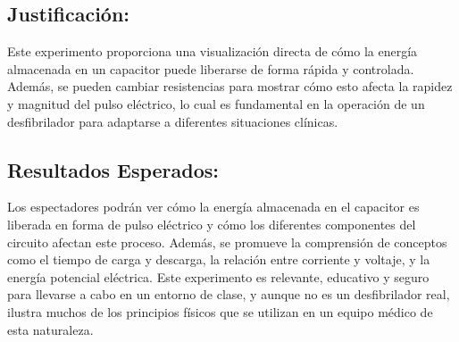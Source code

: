 \subsection{Justificación:}
Este experimento proporciona una visualización directa de cómo la energía almacenada en un capacitor puede liberarse de forma rápida y controlada. Además, se pueden cambiar resistencias para mostrar cómo esto afecta la rapidez y magnitud del pulso eléctrico, lo cual es fundamental en la operación de un desfibrilador para adaptarse a diferentes situaciones clínicas.

\subsection{Resultados Esperados:}
Los espectadores podrán ver cómo la energía almacenada en el capacitor es liberada en forma de pulso eléctrico y cómo los diferentes componentes del circuito afectan este proceso. Además, se promueve la comprensión de conceptos como el tiempo de carga y descarga, la relación entre corriente y voltaje, y la energía potencial eléctrica.\newline \hfill \break
Este experimento es relevante, educativo y seguro para llevarse a cabo en un entorno de clase, y aunque no es un desfibrilador real, ilustra muchos de los principios físicos que se utilizan en un equipo médico de esta naturaleza.

